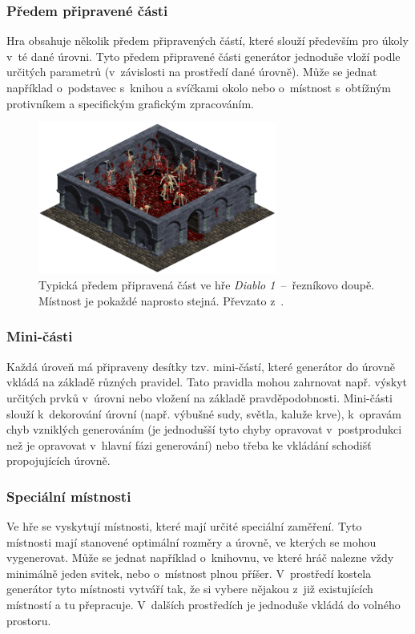 \subsubsection{Předem připravené části}
Hra obsahuje několik předem připravených částí, které slouží především pro úkoly v~té dané úrovni.
Tyto předem připravené části generátor jednoduše vloží podle určitých parametrů (v~závislosti na prostředí dané úrovně).
Může se jednat například o~podstavec s~knihou a svíčkami okolo nebo o~místnost s~obtížným protivníkem a specifickým grafickým zpracováním.
\begin{figure}[hbt]
    \centering
    \includegraphics[width=0.7\textwidth]{obrazky/diablo_1_butcher.png}
    \caption{Typická předem připravená část ve hře \textit{Diablo 1}~--~řezníkovo doupě. Místnost je pokaždé naprosto stejná. Převzato z~\cite{lit:diablo_1}.}
    \label{img:diablo_1_butcher}
\end{figure}
\subsubsection{Mini-části}
Každá úroveň má připraveny desítky tzv. mini-částí, které generátor do úrovně vkládá na základě různých pravidel.
Tato pravidla mohou zahrnovat např. výskyt určitých prvků v~úrovni nebo vložení na základě pravděpodobnosti.
Mini-části slouží k~dekorování úrovní (např. výbušné sudy, světla, kaluže krve), k~opravám chyb vzniklých generováním (je jednodušší tyto chyby opravovat v~postprodukci než je opravovat v~hlavní fázi generování) nebo třeba ke vkládání schodišť propojujících úrovně.
\subsubsection{Speciální místnosti}
Ve hře se vyskytují místnosti, které mají určité speciální zaměření.
Tyto místnosti mají stanovené optimální rozměry a úrovně, ve kterých se mohou vygenerovat.
Může se jednat například o~knihovnu, ve které hráč nalezne vždy minimálně jeden svitek, nebo o~místnost plnou příšer.
V~prostředí kostela generátor tyto místnosti vytváří tak, že si vybere nějakou z~již existujících místností a tu přepracuje.
V~dalších prostředích je jednoduše vkládá do volného prostoru.
